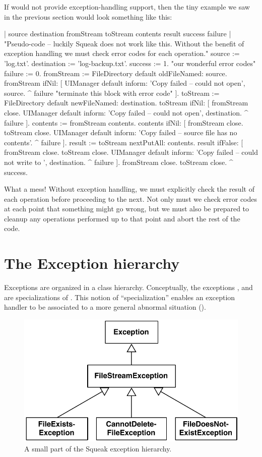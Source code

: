 \documentclass[a4paper,10pt,twoside]{book}
\begin{document}
If \squeak would not provide exception-handling support, then the tiny example we saw in the previous section would look something like this:

\begin{code}{| source destination fromStream toStream contents result success failure |}
"Pseudo-code -- luckily Squeak does not work like this. Without the 
benefit of exception handling we must check error codes for each operation."
source := 'log.txt'.
destination := 'log-backup.txt'.
success := 1. "our wonderful error codes"
failure := 0.
fromStream := FileDirectory default oldFileNamed: source.
fromStream ifNil: [
	UIManager default inform: 'Copy failed -- could not open', source.
	^ failure "terminate this block with error code" ].
toStream := FileDirectory default newFileNamed: destination.
toStream ifNil: [
	fromStream close.
	UIManager default inform: 'Copy failed -- could not open', destination.
	^ failure ].
contents := fromStream contents.
contents ifNil: [
	fromStream close.
	toStream close.
	UIManager default inform: 'Copy failed -- source file has no contents'.
	^ failure ].
result := toStream nextPutAll: contents.
result ifFalse: [
	fromStream close.
	toStream close.
	UIManager default inform: 'Copy failed -- could not write to ', destination.
	^ failure ].
fromStream close.
toStream close.
^ success.
\end{code}
\noindent
What a mess!
Without exception handling, we must explicitly check the result of each operation before proceeding to the next.
Not only must we check error codes at each point that something might go wrong, but we must also be prepared to cleanup any operations performed up to that point and abort the rest of the code.

\section{The Exception hierarchy}

Exceptions are organized in a class hierarchy. Conceptually, the exceptions ,  and  are specializations of . This notion of ``specialization'' enables an exception handler to be associated to a more general abnormal situation ().

\begin{figure}[ht]\centering
        \includegraphics[width=.5\linewidth]{SimpleHierarchy}
        \caption{A small part of the Squeak exception hierarchy.}
\end{figure}
\end{document}
